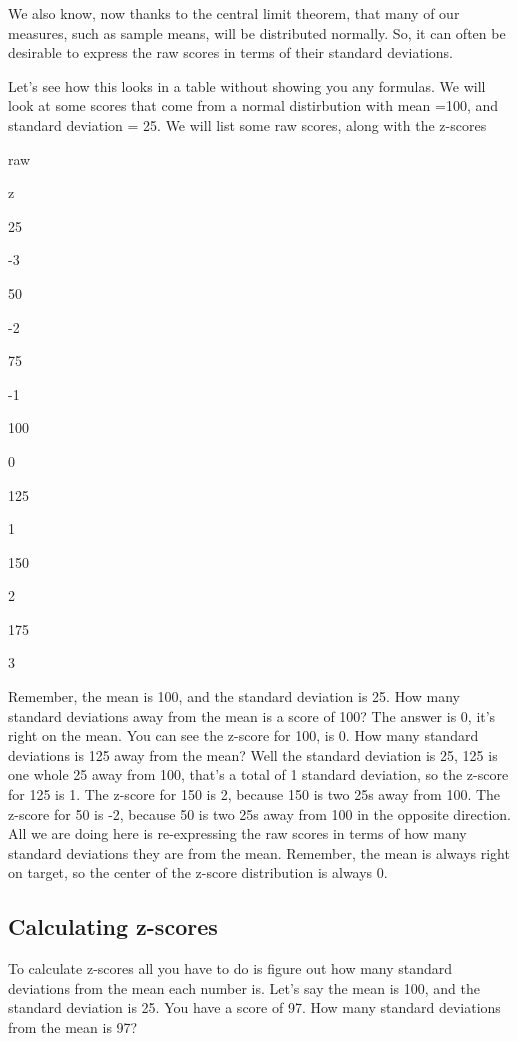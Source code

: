 \documentclass[]{book}
\begin{document}
We also know, now thanks to the central limit theorem, that many of our measures, such as sample means, will be distributed normally. So, it can often be desirable to express the raw scores in terms of their standard deviations.

Let's see how this looks in a table without showing you any formulas. We will look at some scores that come from a normal distirbution with mean =100, and standard deviation = 25. We will list some raw scores, along with the z-scores

raw

z

25

-3

50

-2

75

-1

100

0

125

1

150

2

175

3

Remember, the mean is 100, and the standard deviation is 25. How many standard deviations away from the mean is a score of 100? The answer is 0, it's right on the mean. You can see the z-score for 100, is 0. How many standard deviations is 125 away from the mean? Well the standard deviation is 25, 125 is one whole 25 away from 100, that's a total of 1 standard deviation, so the z-score for 125 is 1. The z-score for 150 is 2, because 150 is two 25s away from 100. The z-score for 50 is -2, because 50 is two 25s away from 100 in the opposite direction. All we are doing here is re-expressing the raw scores in terms of how many standard deviations they are from the mean. Remember, the mean is always right on target, so the center of the z-score distribution is always 0.

\hypertarget{calculating-z-scores}{%
\subsection{Calculating z-scores}\label{calculating-z-scores}}

To calculate z-scores all you have to do is figure out how many standard deviations from the mean each number is. Let's say the mean is 100, and the standard deviation is 25. You have a score of 97. How many standard deviations from the mean is 97?
\end{document}
